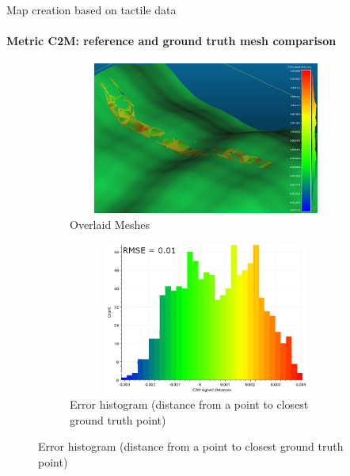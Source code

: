 \documentclass[aspectratio=169,xcolor=table]{beamer}
\begin{document}
\begin{frame}[t]{Map creation based on tactile data}
    \framesubtitle{Metric C2M: reference and ground truth mesh comparison}
    \vspace{-15pt}
    \begin{figure}[H]
        \begin{subfigure}[t]{0.49\textwidth}
            \centering\includegraphics[height=5cm,width=1\textwidth,keepaspectratio]{mesh_comp.png}
            \caption*{Overlaid Meshes}
        \end{subfigure}
        \begin{subfigure}[t]{0.49\textwidth}
            \centering\includegraphics[height=5cm,width=1\textwidth,keepaspectratio]{mesh_hist.png}
            \caption*{Error histogram (distance from a point to closest ground truth point)}
        \end{subfigure}
    \end{figure}
\end{frame}
\end{document}
